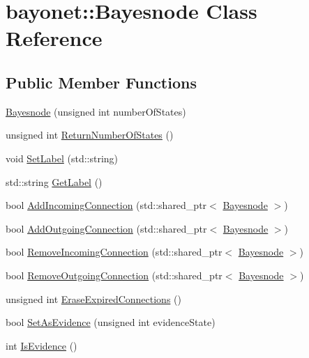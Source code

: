 \hypertarget{classbayonet_1_1_bayesnode}{\section{bayonet\-:\-:Bayesnode Class Reference}
\label{classbayonet_1_1_bayesnode}
}
\subsection*{Public Member Functions}
\begin{DoxyCompactItemize}
\item 
\hyperlink{classbayonet_1_1_bayesnode_a2b676188453fbbb4dc96be714ac931d3}{Bayesnode} (unsigned int number\-Of\-States)
\item 
unsigned int \hyperlink{classbayonet_1_1_bayesnode_a24d38b28413a60938ea7fad7c74e823d}{Return\-Number\-Of\-States} ()
\item 
void \hyperlink{classbayonet_1_1_bayesnode_abaa27f1597d5599344e3a4d82e7b64b0}{Set\-Label} (std\-::string)
\item 
std\-::string \hyperlink{classbayonet_1_1_bayesnode_aebe7f411efe8b8647ed6f7d28f700638}{Get\-Label} ()
\item 
bool \hyperlink{classbayonet_1_1_bayesnode_ad8dbca37751fc6387a370daea4233aaf}{Add\-Incoming\-Connection} (std\-::shared\-\_\-ptr$<$ \hyperlink{classbayonet_1_1_bayesnode}{Bayesnode} $>$)
\item 
bool \hyperlink{classbayonet_1_1_bayesnode_ac43991461780ca9056b4977db4cbd603}{Add\-Outgoing\-Connection} (std\-::shared\-\_\-ptr$<$ \hyperlink{classbayonet_1_1_bayesnode}{Bayesnode} $>$)
\item 
bool \hyperlink{classbayonet_1_1_bayesnode_a2e401b2dbc46513c016d2c894fde3726}{Remove\-Incoming\-Connection} (std\-::shared\-\_\-ptr$<$ \hyperlink{classbayonet_1_1_bayesnode}{Bayesnode} $>$)
\item 
bool \hyperlink{classbayonet_1_1_bayesnode_a5a8ffea3ad34391225c307ad047969c0}{Remove\-Outgoing\-Connection} (std\-::shared\-\_\-ptr$<$ \hyperlink{classbayonet_1_1_bayesnode}{Bayesnode} $>$)
\item 
unsigned int \hyperlink{classbayonet_1_1_bayesnode_a6b85e5dcadbf79631f5789fb205d076d}{Erase\-Expired\-Connections} ()
\item 
bool \hyperlink{classbayonet_1_1_bayesnode_af84f66934ccb24596b5fbb936903e6e3}{Set\-As\-Evidence} (unsigned int evidence\-State)
\item 
int \hyperlink{classbayonet_1_1_bayesnode_a8410fbbba2974a1a4f8ba4914e76bf33}{Is\-Evidence} ()

\end{DoxyCompactItemize}
